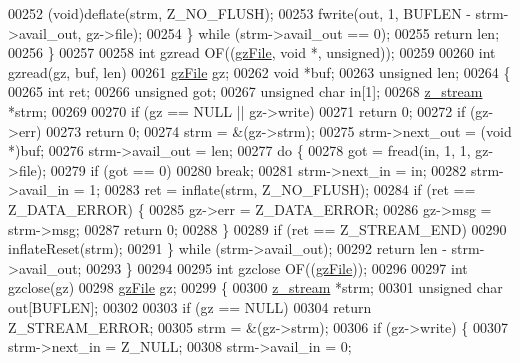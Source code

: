 \begin{DoxyCode}
{{{00252         (void)deflate(strm, Z\_NO\_FLUSH);
00253         fwrite(out, 1, BUFLEN - strm->avail\_out, gz->file);
00254     \} \textcolor{keywordflow}{while} (strm->avail\_out == 0);
00255     \textcolor{keywordflow}{return} len;
00256 \}
00257 
00258 \textcolor{keywordtype}{int} gzread OF((\hyperlink{structgz_file__s}{gzFile}, \textcolor{keywordtype}{void} *, \textcolor{keywordtype}{unsigned}));
00259 
00260 \textcolor{keywordtype}{int} gzread(gz, buf, len)
00261     \hyperlink{structgz_file__s}{gzFile} gz;
00262     \textcolor{keywordtype}{void} *buf;
00263     \textcolor{keywordtype}{unsigned} len;
00264 \{
00265     \textcolor{keywordtype}{int} ret;
00266     \textcolor{keywordtype}{unsigned} got;
00267     \textcolor{keywordtype}{unsigned} \textcolor{keywordtype}{char} in[1];
00268     \hyperlink{structz__stream__s}{z\_stream} *strm;
00269 
00270     \textcolor{keywordflow}{if} (gz == NULL || gz->write)
00271         \textcolor{keywordflow}{return} 0;
00272     \textcolor{keywordflow}{if} (gz->err)
00273         \textcolor{keywordflow}{return} 0;
00274     strm = &(gz->strm);
00275     strm->next\_out = (\textcolor{keywordtype}{void} *)buf;
00276     strm->avail\_out = len;
00277     \textcolor{keywordflow}{do} \{
00278         got = fread(in, 1, 1, gz->file);
00279         \textcolor{keywordflow}{if} (got == 0)
00280             \textcolor{keywordflow}{break};
00281         strm->next\_in = in;
00282         strm->avail\_in = 1;
00283         ret = inflate(strm, Z\_NO\_FLUSH);
00284         \textcolor{keywordflow}{if} (ret == Z\_DATA\_ERROR) \{
00285             gz->err = Z\_DATA\_ERROR;
00286             gz->msg = strm->msg;
00287             \textcolor{keywordflow}{return} 0;
00288         \}
00289         \textcolor{keywordflow}{if} (ret == Z\_STREAM\_END)
00290             inflateReset(strm);
00291     \} \textcolor{keywordflow}{while} (strm->avail\_out);
00292     \textcolor{keywordflow}{return} len - strm->avail\_out;
00293 \}
00294 
00295 \textcolor{keywordtype}{int} gzclose OF((\hyperlink{structgz_file__s}{gzFile}));
00296 
00297 \textcolor{keywordtype}{int} gzclose(gz)
00298     \hyperlink{structgz_file__s}{gzFile} gz;
00299 \{
00300     \hyperlink{structz__stream__s}{z\_stream} *strm;
00301     \textcolor{keywordtype}{unsigned} \textcolor{keywordtype}{char} out[BUFLEN];
00302 
00303     \textcolor{keywordflow}{if} (gz == NULL)
00304         \textcolor{keywordflow}{return} Z\_STREAM\_ERROR;
00305     strm = &(gz->strm);
00306     \textcolor{keywordflow}{if} (gz->write) \{
00307         strm->next\_in = Z\_NULL;
00308         strm->avail\_in = 0;
}}}
\end{DoxyCode}
